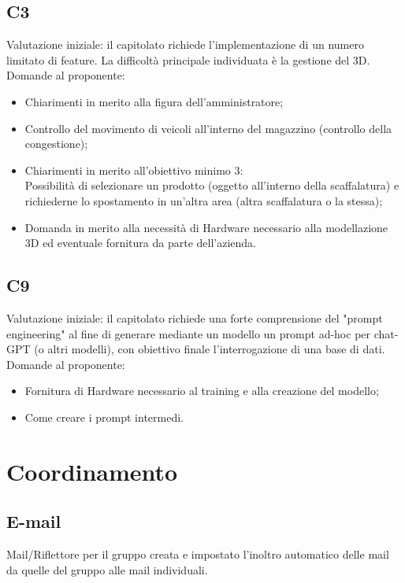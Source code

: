 \documentclass[12pt,a4paper]{article}
\begin{document}
\subsection{C3}
Valutazione iniziale: il capitolato richiede l'implementazione di un numero limitato di feature. La difficoltà principale individuata è la gestione del 3D.\\
Domande al proponente:
\begin{itemize}
    \item Chiarimenti in merito alla figura dell'amministratore;
    \item Controllo del movimento di veicoli all'interno del magazzino (controllo della congestione);
    \item Chiarimenti in merito all'obiettivo minimo 3: \\
    Possibilità di selezionare un prodotto (oggetto all'interno della scaffalatura) e richiederne lo spostamento in un'altra area (altra scaffalatura o la stessa);
    \item Domanda in merito alla necessità di Hardware necessario alla modellazione 3D ed eventuale fornitura da parte dell'azienda.
\end{itemize}

\subsection{C9}
Valutazione iniziale: il capitolato richiede una forte comprensione del "prompt engineering" al fine di generare mediante un modello un prompt ad-hoc per chat-GPT (o altri modelli), con obiettivo finale l'interrogazione di una base di dati.\\
Domande al proponente:
\begin{itemize}
    \item Fornitura di Hardware necessario al training e alla creazione del modello;
    \item Come creare i prompt intermedi.
\end{itemize}

\section{Coordinamento}
\subsection{E-mail}
Mail/Riflettore per il gruppo creata e impostato l'inoltro automatico delle mail da quelle del gruppo alle mail individuali.
\end{document}
